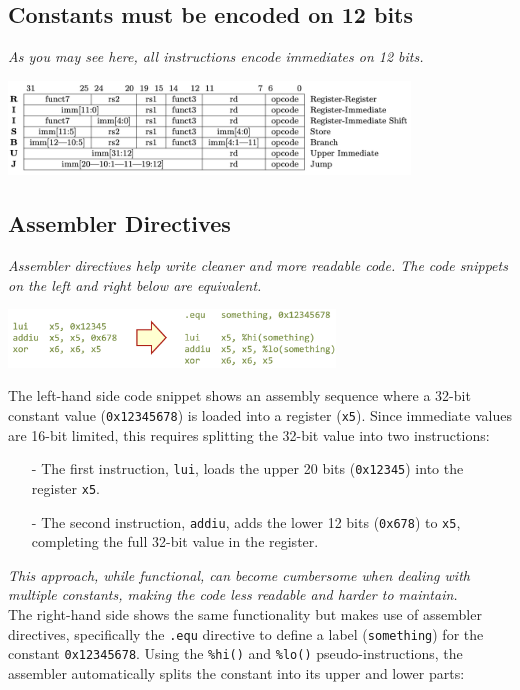 \subsection{Constants must be encoded on 12 bits}
\textit{As you may see here, all instructions encode immediates on 12 bits.}
\begin{center}
    \includegraphics[width=0.8\textwidth]{chapters/chapter1b/images/riscv.png}
\end{center}

\subsection{Assembler Directives} \textit{Assembler directives help write cleaner and more readable code. The code snippets on the left and right below are equivalent.}

\begin{center} \includegraphics[width=0.65\textwidth]{chapters/chapter1b/images/directives.png} \end{center}

The left-hand side code snippet shows an assembly sequence where a 32-bit constant value (\texttt{0x12345678}) is loaded into a register (\texttt{x5}). Since immediate values are 16-bit limited, this requires splitting the 32-bit value into two instructions: 

\begin{itemize}
    \item[-] The first instruction, \texttt{lui}, loads the upper 20 bits (\texttt{0x12345}) into the register \texttt{x5}.
    \item[-] The second instruction, \texttt{addiu}, adds the lower 12 bits (\texttt{0x678}) to \texttt{x5}, completing the full 32-bit value in the register.
\end{itemize}

\textit{This approach, while functional, can become cumbersome when dealing with multiple constants, making the code less readable and harder to maintain. \\
} 
\vspace*{5px}
The right-hand side shows the same functionality but makes use of assembler directives, specifically the \texttt{.equ} directive to define a label (\texttt{something}) for the constant \texttt{0x12345678}. Using the \texttt{\%hi()} and \texttt{\%lo()} pseudo-instructions, the assembler automatically splits the constant into its upper and lower parts:

